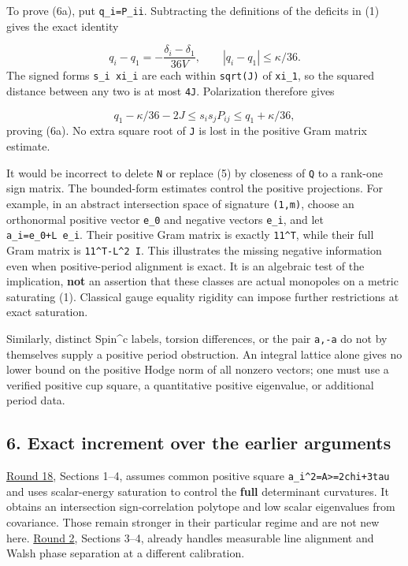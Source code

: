 \documentclass[
  11pt,
]{article}
\begin{document}
To prove (6a), put \texttt{q\_i=P\_ii}. Subtracting the definitions of
the deficits in (1) gives the exact identity

\[
 q_i-q_1=-\frac{\delta_i-\delta_1}{36V},\qquad
 |q_i-q_1|\le\kappa/36.                            \tag{21}
\] The signed forms \texttt{s\_i\ xi\_i} are each within
\texttt{sqrt(J)} of \texttt{xi\_1}, so the squared distance between any
two is at most \texttt{4J}. Polarization therefore gives

\[
 q_1-\kappa/36-2J\le s_i s_jP_{ij}
                       \le q_1+\kappa/36,
\] proving (6a). No extra square root of \texttt{J} is lost in the
positive Gram matrix estimate.

It would be incorrect to delete \texttt{N} or replace (5) by closeness
of \texttt{Q} to a rank-one sign matrix. The bounded-form estimates
control the positive projections. For example, in an abstract
intersection space of signature \texttt{(1,m)}, choose an orthonormal
positive vector \texttt{e\_0} and negative vectors \texttt{e\_i}, and
let \texttt{a\_i=e\_0+L\ e\_i}. Their positive Gram matrix is exactly
\texttt{11\^{}T}, while their full Gram matrix is
\texttt{11\^{}T-L\^{}2\ I}. This illustrates the missing negative
information even when positive-period alignment is exact. It is an
algebraic test of the implication, \textbf{not} an assertion that these
classes are actual monopoles on a metric saturating (1). Classical gauge
equality rigidity can impose further restrictions at exact saturation.

Similarly, distinct Spin\^{}c labels, torsion differences, or the pair
\texttt{a,-a} do not by themselves supply a positive period obstruction.
An integral lattice alone gives no lower bound on the positive Hodge
norm of all nonzero vectors; one must use a verified positive cup
square, a quantitative positive eigenvalue, or additional period data.

\hypertarget{exact-increment-over-the-earlier-arguments}{%
\subsection{6. Exact increment over the earlier
arguments}\label{exact-increment-over-the-earlier-arguments}}

\href{round18_periods.md}{Round 18}, Sections 1--4, assumes common
positive square \texttt{a\_i\^{}2=A\textgreater{}=2chi+3tau} and uses
scalar-energy saturation to control the \textbf{full} determinant
curvatures. It obtains an intersection sign-correlation polytope and low
scalar eigenvalues from covariance. Those remain stronger in their
particular regime and are not new here. \href{round2_rigidity.md}{Round
2}, Sections 3--4, already handles measurable line alignment and Walsh
phase separation at a different calibration.
\end{document}
